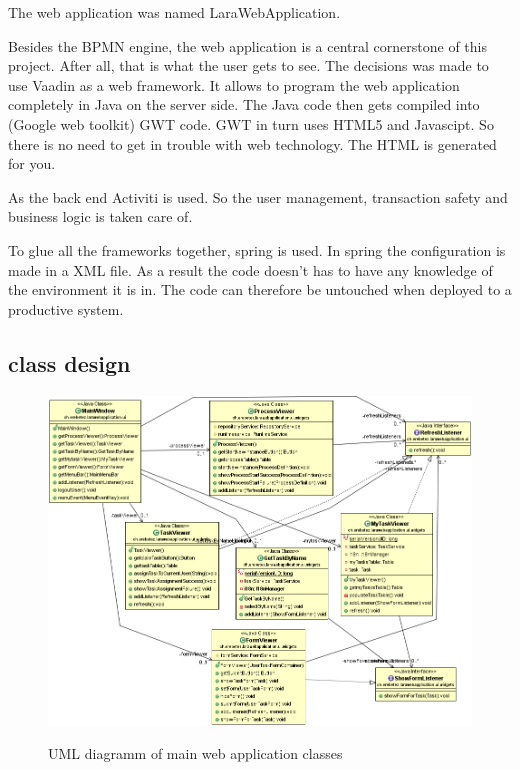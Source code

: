 \documentclass[paper=a4,twoside=false,BCOR=0mm,DIV=calc,fontsize=12pt]{scrartcl}
\begin{document}
The web application was named LaraWebApplication.

Besides the BPMN engine, the web application is a central cornerstone of this project. After all, that is what the user gets to see.
The decisions was made to use Vaadin \cite{Vaadin} as a web framework. It allows to program the web application completely in Java on the server side. The Java code then gets compiled into (Google web toolkit) GWT \cite{gwt} code. GWT in turn uses HTML5 and Javascipt. So there is
no need to get in trouble with web technology. The HTML is generated for you.

As the back end Activiti is used. So the user management, transaction safety and business logic is taken care of.

To glue all the frameworks together, spring is used. In spring the configuration is made in a XML file. As a result the code doesn't has to have any 
knowledge of the environment it is in. The code can therefore be untouched when deployed to a productive system.



\subsection{class design}
\begin{figure}
    \begin{center}
      \includegraphics[width=1\textwidth]{./img/uml_webapp_model.png}\\
    \end{center}
  \caption{UML diagramm of main web application classes}
  \label{webapplicationclassuml}
\end{figure} 
\end{document}
